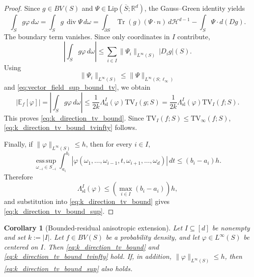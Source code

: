 \documentclass[11pt,letterpaper]{article}
\newtheorem{corollary}[theorem]{Corollary}
\theoremstyle{definition}
\theoremstyle{remark}
\newcommand{\TV}{\mathrm{TV}}
\begin{document}
\begin{proof}
Since $g\in BV(S)$ and $\Psi\in\mathrm{Lip}(\overline S;\mathbb R^d)$, the
Gauss--Green identity yields
$$
\int_S g\varphi\,d\omega
=
\int_S g\,\operatorname{div}\Psi\,d\omega
=
\int_{\partial S}\operatorname{Tr}(g)(\Psi\cdot n)\,d\mathcal H^{d-1}
-
\int_S\Psi\cdot d(Dg).
$$
The boundary term vanishes. Since only coordinates in $I$ contribute,
$$
\left|\int_S g\varphi\,d\omega\right|
\le
\sum_{i\in I}\|\Psi_i\|_{L^\infty(S)}\,|D_i g|(S).
$$
Using
$$
\|\Psi_i\|_{L^\infty(S)}
\le
\|\Psi\|_{L^\infty(S;\ell_\infty)}
$$
and \eqref{eq:vector_field_sup_bound_tv}, we obtain
$$
|\mathbb E_f[\varphi]|
=
\left|\int_S g\varphi\,d\omega\right|
\le
\frac{1}{2k}
\Lambda_{\mathrm{sl}}^I(\varphi)
\TV_I(g;S)
=
\frac{1}{2k}
\Lambda_{\mathrm{sl}}^I(\varphi)
\TV_I(f;S).
$$
This proves \eqref{eq:k_direction_tv_bound}. Since
$\TV_I(f;S)\le \TV_\infty(f;S)$, \eqref{eq:k_direction_tv_bound_tvinfty}
follows.

Finally, if $\|\varphi\|_{L^\infty(S)}\le h$, then for every $i\in I$,
$$
\operatorname*{ess\,sup}_{\omega_{-i}\in S_{-i}}
\int_{a_i}^{b_i}
|\varphi(\omega_1,\ldots,\omega_{i-1},t,\omega_{i+1},\ldots,\omega_d)|\,dt
\le
(b_i-a_i)h.
$$
Therefore
$$
\Lambda_{\mathrm{sl}}^I(\varphi)
\le
\left(\max_{i\in I}(b_i-a_i)\right)h,
$$
and substitution into \eqref{eq:k_direction_tv_bound} gives
\eqref{eq:k_direction_tv_bound_sup}.
\end{proof}

\begin{corollary}[Bounded-residual anisotropic extension]
\label{cor:bounded_residual_tv_extension}
Let $I\subseteq[d]$ be nonempty and set $k:=|I|$. Let
$f\in BV(S)$ be a probability density, and let
$\varphi\in L^\infty(S)$ be centered on $I$. Then \eqref{eq:k_direction_tv_bound} and
\eqref{eq:k_direction_tv_bound_tvinfty} hold. If, in addition,
$\|\varphi\|_{L^\infty(S)}\le h$, then
\eqref{eq:k_direction_tv_bound_sup} also holds.
\end{corollary}
\end{document}

